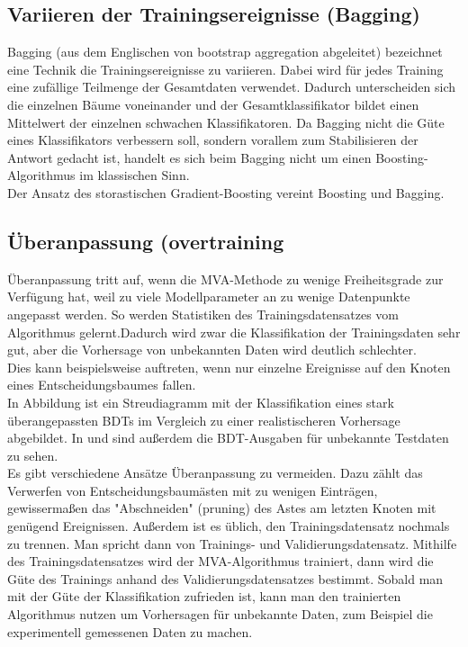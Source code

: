 \subsection{Variieren der Trainingsereignisse (Bagging)}
\label{ch:Algorithmen:subsec:Bagging}

Bagging (aus dem Englischen von bootstrap aggregation abgeleitet) bezeichnet eine Technik die Trainingsereignisse zu variieren. Dabei wird f\"ur jedes Training eine zuf\"allige Teilmenge der Gesamtdaten verwendet. Dadurch unterscheiden sich die einzelnen B\"aume voneinander und der Gesamtklassifikator bildet einen Mittelwert der einzelnen schwachen Klassifikatoren. Da Bagging nicht die G\"ute eines Klassifikators verbessern soll, sondern vorallem zum Stabilisieren der Antwort gedacht ist, handelt es sich beim Bagging nicht um einen Boosting-Algorithmus im klassischen Sinn. \cite{Hocker:2007ht}\\
Der Ansatz des storastischen Gradient-Boosting vereint Boosting und Bagging.

\subsection{\"Uberanpassung (overtraining}
\label{ch:Algorithmen:subsec:overtraining}

\"Uberanpassung tritt auf, wenn die MVA-Methode zu wenige Freiheitsgrade zur Verf\"ugung hat, weil zu viele Modellparameter an zu wenige Datenpunkte angepasst werden. So werden Statistiken des Trainingsdatensatzes vom Algorithmus gelernt.Dadurch wird zwar die Klassifikation der Trainingsdaten sehr gut, aber die Vorhersage von unbekannten Daten wird deutlich schlechter.\\
Dies kann beispielsweise auftreten, wenn nur einzelne Ereignisse auf den Knoten eines Entscheidungsbaumes fallen.\\
In Abbildung  ist ein Streudiagramm mit der Klassifikation eines stark \"uberangepassten BDTs im Vergleich zu einer realistischeren Vorhersage abgebildet. In            und           sind au\ss erdem die BDT-Ausgaben f\"ur unbekannte Testdaten zu sehen.\\
Es gibt verschiedene Ans\"atze \"Uberanpassung zu vermeiden. Dazu z\"ahlt das Verwerfen von Entscheidungsbaum\"asten mit zu wenigen Eintr\"agen, gewisserma\ss en das "Abschneiden" (pruning) des Astes am letzten Knoten mit gen\"ugend Ereignissen. Au\ss erdem ist es \"ublich, den Trainingsdatensatz nochmals zu trennen. Man spricht dann von Trainings- und Validierungsdatensatz. Mithilfe des Trainingsdatensatzes wird der MVA-Algorithmus trainiert, dann wird die G\"ute des Trainings anhand des Validierungsdatensatzes bestimmt. Sobald man mit der G\"ute der Klassifikation zufrieden ist, kann man den trainierten Algorithmus nutzen um Vorhersagen f\"ur unbekannte Daten, zum Beispiel die experimentell gemessenen Daten zu machen.

